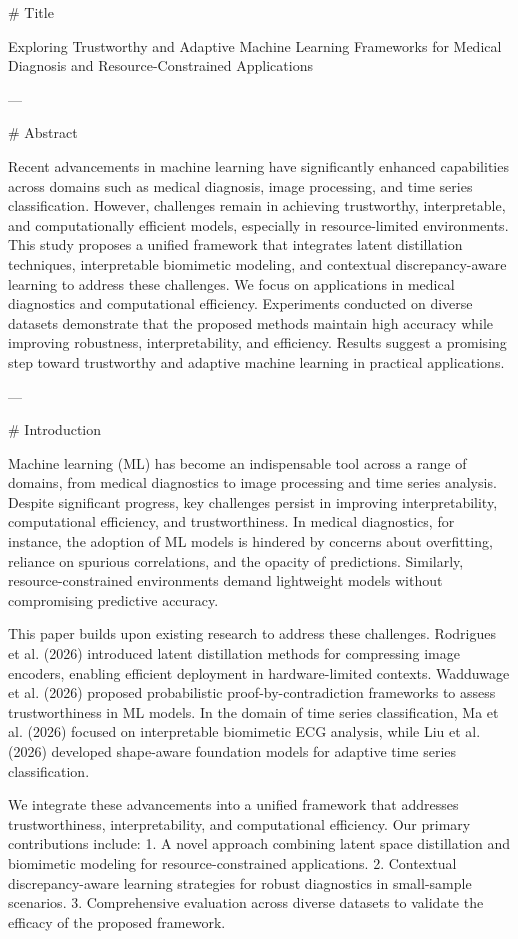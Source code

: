 # Title

Exploring Trustworthy and Adaptive Machine Learning Frameworks for Medical Diagnosis and Resource-Constrained Applications

---

# Abstract

Recent advancements in machine learning have significantly enhanced capabilities across domains such as medical diagnosis, image processing, and time series classification. However, challenges remain in achieving trustworthy, interpretable, and computationally efficient models, especially in resource-limited environments. This study proposes a unified framework that integrates latent distillation techniques, interpretable biomimetic modeling, and contextual discrepancy-aware learning to address these challenges. We focus on applications in medical diagnostics and computational efficiency. Experiments conducted on diverse datasets demonstrate that the proposed methods maintain high accuracy while improving robustness, interpretability, and efficiency. Results suggest a promising step toward trustworthy and adaptive machine learning in practical applications.

---

# Introduction

Machine learning (ML) has become an indispensable tool across a range of domains, from medical diagnostics to image processing and time series analysis. Despite significant progress, key challenges persist in improving interpretability, computational efficiency, and trustworthiness. In medical diagnostics, for instance, the adoption of ML models is hindered by concerns about overfitting, reliance on spurious correlations, and the opacity of predictions. Similarly, resource-constrained environments demand lightweight models without compromising predictive accuracy.

This paper builds upon existing research to address these challenges. Rodrigues et al. (2026) introduced latent distillation methods for compressing image encoders, enabling efficient deployment in hardware-limited contexts. Wadduwage et al. (2026) proposed probabilistic proof-by-contradiction frameworks to assess trustworthiness in ML models. In the domain of time series classification, Ma et al. (2026) focused on interpretable biomimetic ECG analysis, while Liu et al. (2026) developed shape-aware foundation models for adaptive time series classification.

We integrate these advancements into a unified framework that addresses trustworthiness, interpretability, and computational efficiency. Our primary contributions include:
1. A novel approach combining latent space distillation and biomimetic modeling for resource-constrained applications.
2. Contextual discrepancy-aware learning strategies for robust diagnostics in small-sample scenarios.
3. Comprehensive evaluation across diverse datasets to validate the efficacy of the proposed framework.

